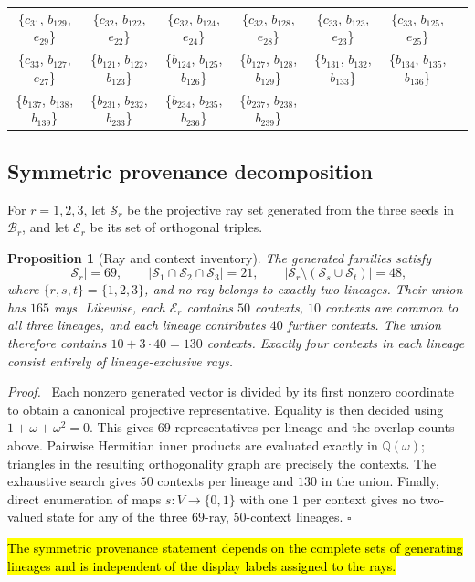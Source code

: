 \documentclass[%
  reprint,
  superscriptaddress,
  showpacs,
  showkeys,
  amsmath,amssymb,
  pra,
  longbibliography,
  floatfix,
  x11names
]{revtex4-2}
\newenvironment{revision}{\begingroup\color{revisionblue}}{\endgroup}
\newcommand{\corr}[1]{{\color{red}\hl{#1}}}
\newtheorem{proposition}{Proposition}
\newenvironment{proof}{\par\noindent\textit{Proof.}\ }{\hfill$\square$\par}
\begin{document}
\begin{table}[htbp!]
\begin{ruledtabular}
\begin{tabular}{ccccccc}
\{$c_{31}$, $b_{129}$, $e_{29}$\} & \{$c_{32}$, $b_{122}$, $e_{22}$\} & \{$c_{32}$, $b_{124}$, $e_{24}$\} & \{$c_{32}$, $b_{128}$, $e_{28}$\} & \{$c_{33}$, $b_{123}$, $e_{23}$\} & \{$c_{33}$, $b_{125}$, $e_{25}$\} \\
\{$c_{33}$, $b_{127}$, $e_{27}$\} & \{$b_{121}$, $b_{122}$, $b_{123}$\} & \{$b_{124}$, $b_{125}$, $b_{126}$\} & \{$b_{127}$, $b_{128}$, $b_{129}$\} & \{$b_{131}$, $b_{132}$, $b_{133}$\} & \{$b_{134}$, $b_{135}$, $b_{136}$\} \\
\{$b_{137}$, $b_{138}$, $b_{139}$\} & \{$b_{231}$, $b_{232}$, $b_{233}$\} & \{$b_{234}$, $b_{235}$, $b_{236}$\} & \{$b_{237}$, $b_{238}$, $b_{239}$\} & & \\
\end{tabular}
\end{ruledtabular}
\end{table}

\begin{revision}
\subsection{Symmetric provenance decomposition}

For $r=1,2,3$, let $\mathcal{S}_r$ be the projective ray set generated from the three seeds in $\mathcal{B}_r$, and let $\mathcal{E}_r$ be its set of orthogonal triples.

\begin{proposition}[Ray and context inventory]
\label{prop:provenance}
The generated families satisfy
\[
|\mathcal{S}_r|=69,\qquad
|\mathcal{S}_1\cap\mathcal{S}_2\cap\mathcal{S}_3|=21,
\qquad |\mathcal{S}_r\setminus(\mathcal{S}_s\cup\mathcal{S}_t)|=48,
\]
where $\{r,s,t\}=\{1,2,3\}$, and no ray belongs to exactly two lineages.  Their union has $165$
rays.  Likewise, each $\mathcal{E}_r$ contains $50$ contexts, $10$ contexts are common to all three lineages, and each lineage contributes $40$ further contexts.  The union therefore contains $10+3\cdot40=130$ contexts.  Exactly four contexts in each lineage consist entirely of lineage-exclusive rays.
\end{proposition}

\begin{proof}
Each nonzero generated vector is divided by its first nonzero coordinate to obtain a canonical projective representative.  Equality is then decided using $1+\omega+\omega^2=0$.  This gives $69$ representatives per lineage and the overlap counts above.  Pairwise Hermitian inner products are evaluated exactly in $\mathbb{Q}(\omega)$; triangles in the resulting orthogonality graph are precisely the contexts.  The exhaustive search gives $50$ contexts per lineage and $130$ in the union.  Finally, direct enumeration of maps $s:V\to\{0,1\}$ with one $1$ per context gives no two-valued state for any of the three $69$-ray, $50$-context lineages.
\end{proof}

\corr{The symmetric provenance statement depends on the complete sets of generating lineages and is independent of the display labels assigned to the rays.}
\end{revision}
\end{document}
